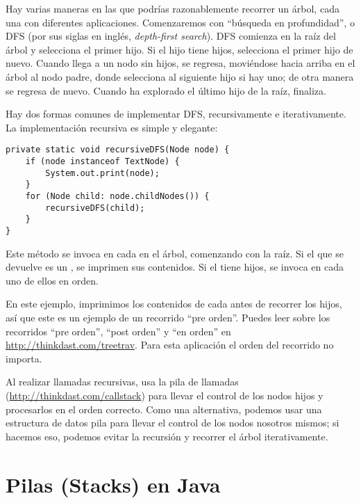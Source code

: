 \documentclass[12pt]{book}
\theoremstyle{exercise}
\begin{document}
Hay varias maneras en las que podrías razonablemente recorrer un árbol, cada una
con diferentes aplicaciones. Comenzaremos con ``búsqueda en profundidad'', o
DFS (por sus siglas en inglés, \emph{depth-first search}). DFS comienza en la raíz
del árbol y selecciona el primer hijo. Si el hijo tiene hijos, selecciona el primer hijo de
nuevo. Cuando llega a un nodo sin hijos, se regresa, moviéndose hacia arriba en el
árbol al nodo padre, donde selecciona al siguiente hijo si hay uno; de otra manera
se regresa de nuevo. Cuando ha explorado el último hijo de la raíz, finaliza.


Hay dos formas comunes de implementar DFS, recursivamente e iterativamente.
La implementación recursiva es simple y elegante:

\begin{verbatim}
private static void recursiveDFS(Node node) {
    if (node instanceof TextNode) {
        System.out.print(node);
    }
    for (Node child: node.childNodes()) {
        recursiveDFS(child);
    }
}
\end{verbatim}

Este método se invoca en cada  en el árbol, comenzando
con la raíz. Si el  que se devuelve es un , se
imprimen sus contenidos. Si el  tiene hijos, se invoca
 en cada uno de ellos en orden.


En este ejemplo, imprimimos los contenidos de cada  antes
de recorrer los hijos, así que este es un ejemplo de un recorrido
``pre orden''. Puedes leer sobre los recorridos ``pre orden'', ``post orden''
y ``en orden'' en \url{http://thinkdast.com/treetrav}.  Para esta aplicación
el orden del recorrido no importa.


Al realizar llamadas recursivas,  usa la pila de llamadas
(\url{http://thinkdast.com/callstack}) para llevar el control
de los nodos hijos y procesarlos en el orden correcto. Como una
alternativa, podemos usar una estructura de datos pila para llevar
el control de los nodos nosotros mismos; si hacemos eso, podemos evitar
la recursión y recorrer el árbol iterativamente.


\section{Pilas (Stacks) en Java}
\label{stacks-in-java}
\end{document}

